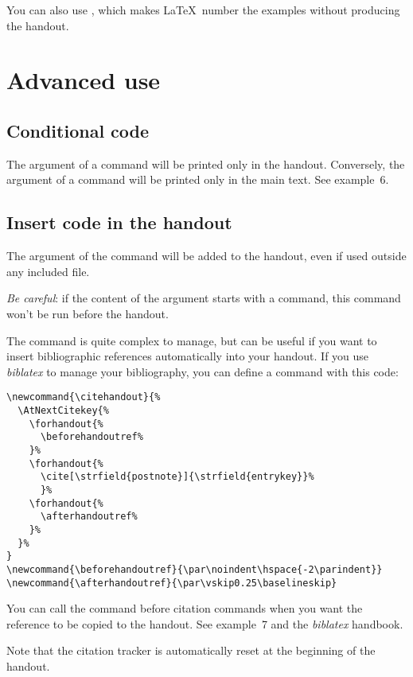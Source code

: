 \documentclass{ltxdockit}[2011/03/25]
\begin{document}
\label{printing} You can also use , which makes \LaTeX\ number the examples without producing the handout.

\section{Advanced use}
\subsection{Conditional code}

The argument of a   command will be printed only in the handout. Conversely, the argument of a command  will be printed only in the main text. See example~6.

\subsection{Insert code in the handout}

The argument of the   command will be added to the handout, even if used outside any included file.

\emph{Be careful}: if the content of the argument starts with a command, this command won't be run before the handout.

The  command is quite complex to manage, but can be useful if you want to insert bibliographic references automatically into your handout. If you use \emph{biblatex} to manage your bibliography, you can define a  command with this code:


\begin{verbatim}
\newcommand{\citehandout}{%
  \AtNextCitekey{%
    \forhandout{%
      \beforehandoutref%
    }%
    \forhandout{%
      \cite[\strfield{postnote}]{\strfield{entrykey}}%
      }%
    \forhandout{%
      \afterhandoutref%
    }%
  }%
}
\newcommand{\beforehandoutref}{\par\noindent\hspace{-2\parindent}}
\newcommand{\afterhandoutref}{\par\vskip0.25\baselineskip}
\end{verbatim}

You can call the  command before citation commands when you want the reference to be copied to the handout. See example~7 and the \emph{biblatex} handbook.


Note that the citation tracker is automatically reset at the beginning of the handout.
\end{document}
